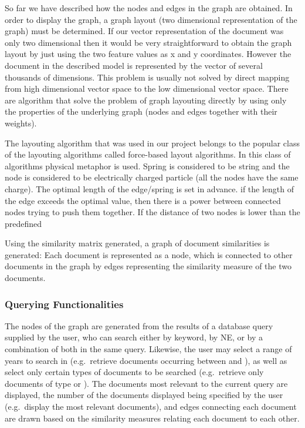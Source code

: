 
So far we have described how the nodes and edges in the graph are obtained. In order to display the graph, a graph layout (two dimensional representation of the graph) must be determined. If our vector representation of the document was only two dimensional then it would be very straightforward to obtain the graph layout
by just using the two feature values as x and y coordinates. However the document in the described model is represented by the vector of several thousands of dimensions. This problem is usually not solved by direct mapping from high dimensional vector space to the low dimensional vector space. There are algorithm that solve the problem of graph layouting directly by using only the properties of the underlying graph (nodes and edges together with their weights).

The layouting algorithm that was used in our project belongs to the popular class of the layouting algorithms called force-based layout algorithms. In this class of algorithms physical metaphor is used. Spring is considered to be string and the node is considered to be electrically charged particle (all the nodes have the same charge). The optimal length of the edge/spring is set in advance. if the length of the edge exceeds the optimal value, then there is a power between connected nodes trying to push them together. If the distance of two nodes is lower than the predefined

Using the similarity matrix generated, a graph of document similarities is generated: Each document is represented as a node, which is connected to other documents in the graph by edges representing the similarity measure of the two documents.

\subsubsection {Querying Functionalities}
\label{sec:querying_functionalities}
The nodes of the graph are generated from the results of a database query supplied by the user, who can search either by keyword, by NE, or by a combination of both in the same query. Likewise, the user may select a range of years to search in (e.g.\ retrieve documents occurring between  and ), as well as select only certain types of documents to be searched (e.g.\ retrieve only documents of type  or ). The documents most relevant to the current query are displayed, the number of the documents displayed being specified by the user (e.g.\ display the  most relevant documents), and edges connecting each document are drawn based on the similarity measures relating each document to each other.

